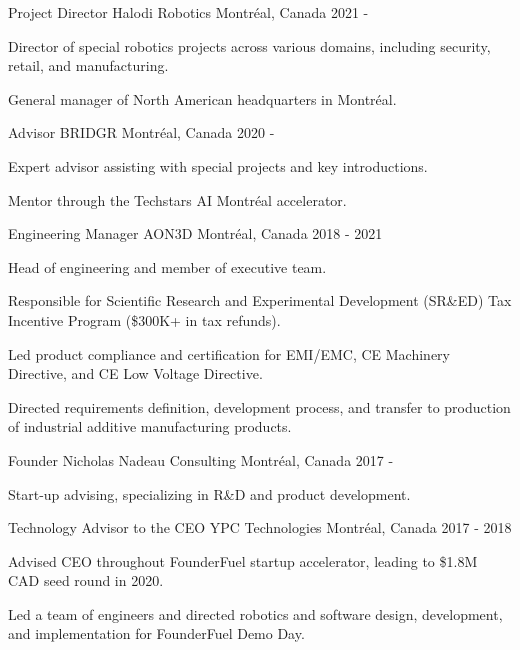 \begin{cventries}

\cventry
{Project Director}
{Halodi Robotics}
{Montréal, Canada}
{2021 - }
{
\begin{cvitems}
\item{Director of special robotics projects across various domains, including security, retail, and manufacturing.}
\item{General manager of North American headquarters in Montréal.}
\end{cvitems}
}

\cventry
{Advisor}
{BRIDGR}
{Montréal, Canada}
{2020 - }
{
\begin{cvitems}
\item{Expert advisor assisting with special projects and key introductions.}
\item{Mentor through the Techstars AI Montréal accelerator.}
\end{cvitems}
}

\cventry
{Engineering Manager}
{AON3D}
{Montréal, Canada}
{2018 - 2021}
{
\begin{cvitems}
\item{Head of engineering and member of executive team.}
\item{Responsible for Scientific Research and Experimental Development (SR\&ED) Tax Incentive Program (\$300K+ in tax refunds).}
\item{Led product compliance and certification for EMI/EMC, CE Machinery Directive, and CE Low Voltage Directive.}
\item{Directed requirements definition, development process, and transfer to production of industrial additive manufacturing products.}
\end{cvitems}
}

\cventry
{Founder}
{Nicholas Nadeau Consulting}
{Montréal, Canada}
{2017 - }
{
\begin{cvitems}
\item{Start-up advising, specializing in R\&D and product development.}
\end{cvitems}
}

\cventry
{Technology Advisor to the CEO}
{YPC Technologies}
{Montréal, Canada}
{2017 - 2018}
{
\begin{cvitems}
\item{Advised CEO throughout FounderFuel startup accelerator, leading to \$1.8M CAD seed round in 2020.}
\item{Led a team of engineers and directed robotics and software design, development, and implementation for FounderFuel Demo Day.}
\end{cvitems}
}


\end{cventries}
